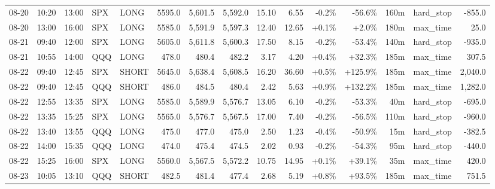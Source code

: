 \documentclass[11pt,a4paper,twoside]{article}
\begin{document}
\begin{landscape}
\begin{center}
\begin{longtable}{>{\color{txtmain}}l l l l l r r r r r r r r >{\color{txtmain}}l r}
08-20 & 10:20 & 13:00 & SPX & LONG & 5595.0 & 5,601.5 & 5,592.0 & 15.10 & 6.55 & \textcolor{lossred}{-0.2\%} & \textcolor{lossred}{-56.6\%} & 160m & hard\_stop & \textcolor{lossred}{-855.0} \\
08-20 & 13:00 & 16:00 & SPX & LONG & 5585.0 & 5,591.9 & 5,597.3 & 12.40 & 12.65 & \textcolor{wingreen}{+0.1\%} & \textcolor{wingreen}{+2.0\%} & 180m & max\_time & \textcolor{wingreen}{25.0} \\
08-21 & 09:40 & 12:00 & SPX & LONG & 5605.0 & 5,611.8 & 5,600.3 & 17.50 & 8.15 & \textcolor{lossred}{-0.2\%} & \textcolor{lossred}{-53.4\%} & 140m & hard\_stop & \textcolor{lossred}{-935.0} \\
08-21 & 10:55 & 14:00 & QQQ & LONG & 478.0 & 480.4 & 482.2 & 3.17 & 4.20 & \textcolor{wingreen}{+0.4\%} & \textcolor{wingreen}{+32.3\%} & 185m & max\_time & \textcolor{wingreen}{307.5} \\
08-22 & 09:40 & 12:45 & SPX & SHORT & 5645.0 & 5,638.4 & 5,608.5 & 16.20 & 36.60 & \textcolor{wingreen}{+0.5\%} & \textcolor{wingreen}{+125.9\%} & 185m & max\_time & \textcolor{wingreen}{2,040.0} \\
08-22 & 09:40 & 12:45 & QQQ & SHORT & 486.0 & 484.5 & 480.4 & 2.42 & 5.63 & \textcolor{wingreen}{+0.9\%} & \textcolor{wingreen}{+132.2\%} & 185m & max\_time & \textcolor{wingreen}{1,282.0} \\
08-22 & 12:55 & 13:35 & SPX & LONG & 5585.0 & 5,589.9 & 5,576.7 & 13.05 & 6.10 & \textcolor{lossred}{-0.2\%} & \textcolor{lossred}{-53.3\%} & 40m & hard\_stop & \textcolor{lossred}{-695.0} \\
08-22 & 13:35 & 15:25 & SPX & LONG & 5565.0 & 5,576.7 & 5,567.5 & 17.00 & 7.40 & \textcolor{lossred}{-0.2\%} & \textcolor{lossred}{-56.5\%} & 110m & hard\_stop & \textcolor{lossred}{-960.0} \\
08-22 & 13:40 & 13:55 & QQQ & LONG & 475.0 & 477.0 & 475.0 & 2.50 & 1.23 & \textcolor{lossred}{-0.4\%} & \textcolor{lossred}{-50.9\%} & 15m & hard\_stop & \textcolor{lossred}{-382.5} \\
08-22 & 14:00 & 15:35 & QQQ & LONG & 474.0 & 475.4 & 474.5 & 2.02 & 0.93 & \textcolor{lossred}{-0.2\%} & \textcolor{lossred}{-54.3\%} & 95m & hard\_stop & \textcolor{lossred}{-440.0} \\
08-22 & 15:25 & 16:00 & SPX & LONG & 5560.0 & 5,567.5 & 5,572.2 & 10.75 & 14.95 & \textcolor{wingreen}{+0.1\%} & \textcolor{wingreen}{+39.1\%} & 35m & max\_time & \textcolor{wingreen}{420.0} \\
08-23 & 10:05 & 13:10 & QQQ & SHORT & 482.5 & 481.4 & 477.4 & 2.68 & 5.19 & \textcolor{wingreen}{+0.8\%} & \textcolor{wingreen}{+93.5\%} & 185m & max\_time & \textcolor{wingreen}{751.5} \\

\end{longtable}
\end{center}
\end{landscape}
\end{document}
